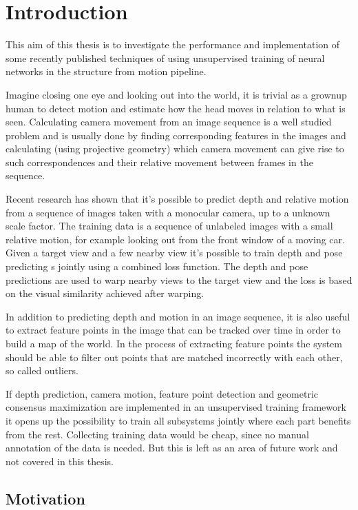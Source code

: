 \chapter{Introduction}\label{cha:introduction}

This aim of this thesis is to investigate the performance and implementation of some recently published techniques of using unsupervised training of neural networks in the structure from motion pipeline. 

Imagine closing one eye and looking out into the world, it is trivial as a grownup human to detect motion and estimate how the head moves in relation to what is seen. Calculating camera movement from an image sequence is a well studied problem and is usually done by finding corresponding features in the images and calculating (using projective geometry) which camera movement can give rise to such correspondences and their relative movement between frames in the sequence.

Recent research has shown that it's possible to predict depth and relative motion from a sequence of images taken with a monocular \abbrRGB camera, up to a unknown scale factor. The training data is a sequence of unlabeled images with a small relative motion, for example looking out from the front window of a moving car. Given a target view and a few nearby view it's possible to train depth and pose predicting \abbrCNN{}s jointly using a combined loss function. The depth and pose predictions are used to warp nearby views to the target view and the loss is based on the visual similarity achieved after warping.

In addition to predicting depth and motion in an image sequence, it is also useful to extract feature points in the image that can be tracked over time in order to build a map of the world. In the process of extracting feature points the system should be able to filter out points that are matched incorrectly with each other, so called outliers.

If depth prediction, camera motion, feature point detection and geometric consensus maximization are implemented in an unsupervised training framework it opens up the possibility to train all subsystems jointly where each part benefits from the rest. Collecting training data would be cheap, since no manual annotation of the data is needed. But this is left as an area of future work and not covered in this thesis.

\section{Motivation}

